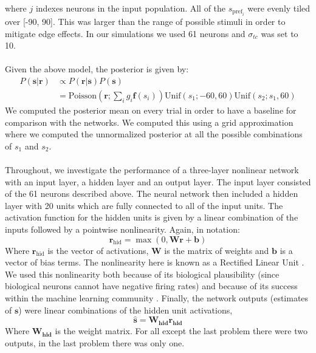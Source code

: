 \documentclass{article} %
\begin{document}
\\
where $j$ indexes neurons in the input population. All of the $s_{\text{pref}_i}$ were evenly tiled over [-90, 90]. This was larger than the range of possible stimuli in order to mitigate edge effects. In our simulations we used 61 neurons and $\sigma_{tc}$ was set to 10.
\\
\\
Given the above model, the posterior is given by:
\begin{equation}
\begin{aligned}
	P(\mathbf{s}|\mathbf{r}) &\propto  P(\mathbf{r}|\mathbf{s})P(\mathbf{s})\\
	&= \text{Poisson}(\mathbf{r}; \sum_i g_i \mathbf{f}(s_i)) \text{Unif}(s_1; -60, 60) \text{Unif}(s_2; s_1, 60)
\end{aligned}
\end{equation}
We computed the posterior mean on every trial in order to have a baseline for comparison with the networks. We computed this using a grid approximation where we computed the unnormalized posterior at all the possible combinations of $s_1$ and $s_2$.
\\
\\
Throughout, we investigate the performance of a three-layer nonlinear network with an input layer, a hidden layer and an output layer. The input layer consisted of the 61 neurons described above. The neural network then included a hidden layer with 20 units which are fully connected to all of the input units. The activation function for the hidden units is given by a linear combination of the inputs followed by a pointwise nonlinearity. Again, in notation:
\begin{equation}
	\mathbf{r}_{\text{hid}} = \max(0, \mathbf{Wr + b})
\end{equation}
Where $\mathbf{r}_{\text{hid}}$ is the vector of activations, $\mathbf{W}$ is the matrix of weights and $\mathbf{b}$ is a vector of bias terms. The nonlinearity here is known as a Rectified Linear Unit \cite{NairH10}.
We used this nonlinearity both because of its biological plausibility (since biological neurons cannot have negative firing rates) and because of its success within the machine learning community \cite{Maas2013}.
Finally, the network outputs (estimates of $\mathbf{s}$) were linear combinations of the hidden unit activations,  
\begin{equation}
	\mathbf{\hat{s}} = \mathbf{W_{\text{hid}} r_{\text{hid}}}
\end{equation}
Where $\mathbf{W_{\text{hid}}}$ is the weight matrix. For all except the last problem there were two outputs, in the last problem there was only one. 
\end{document}
